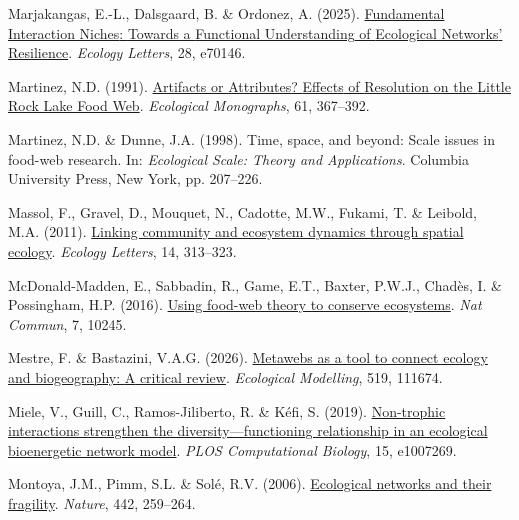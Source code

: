 \documentclass[
]{article}
\newlength{\cslhangindent}
\newenvironment{CSLReferences}[2] %
 {\begin{list}{}{%
  \setlength{\itemindent}{0pt}
  \setlength{\leftmargin}{0pt}
  \setlength{\parsep}{0pt}
  \ifodd #1
   \setlength{\leftmargin}{\cslhangindent}
   \setlength{\itemindent}{-1\cslhangindent}
  \fi
  \setlength{\itemsep}{#2\baselineskip}}}
 {\end{list}}
\begin{document}
\begin{CSLReferences}{1}{0}
Marjakangas, E.-L., Dalsgaard, B. \& Ordonez, A. (2025).
\href{https://doi.org/10.1111/ele.70146}{Fundamental {Interaction
Niches}: {Towards} a {Functional Understanding} of {Ecological
Networks}' {Resilience}}. \emph{Ecology Letters}, 28, e70146.

Martinez, N.D. (1991). \href{https://doi.org/10.2307/2937047}{Artifacts
or {Attributes}? {Effects} of {Resolution} on the {Little Rock Lake Food
Web}}. \emph{Ecological Monographs}, 61, 367--392.

Martinez, N.D. \& Dunne, J.A. (1998). Time, space, and beyond: Scale
issues in food-web research. In: \emph{Ecological {Scale}: {Theory} and
{Applications}}. Columbia University Press, New York, pp. 207--226.

Massol, F., Gravel, D., Mouquet, N., Cadotte, M.W., Fukami, T. \&
Leibold, M.A. (2011).
\href{https://doi.org/10.1111/j.1461-0248.2011.01588.x}{Linking
community and ecosystem dynamics through spatial ecology}. \emph{Ecology
Letters}, 14, 313--323.

McDonald-Madden, E., Sabbadin, R., Game, E.T., Baxter, P.W.J., Chadès,
I. \& Possingham, H.P. (2016).
\href{https://doi.org/10.1038/ncomms10245}{Using food-web theory to
conserve ecosystems}. \emph{Nat Commun}, 7, 10245.

Mestre, F. \& Bastazini, V.A.G. (2026).
\href{https://doi.org/10.1016/j.ecolmodel.2026.111674}{Metawebs as a
tool to connect ecology and biogeography: {A} critical review}.
\emph{Ecological Modelling}, 519, 111674.

Miele, V., Guill, C., Ramos-Jiliberto, R. \& Kéfi, S. (2019).
\href{https://doi.org/10.1371/journal.pcbi.1007269}{Non-trophic
interactions strengthen the diversity---functioning relationship in an
ecological bioenergetic network model}. \emph{PLOS Computational
Biology}, 15, e1007269.

Montoya, J.M., Pimm, S.L. \& Solé, R.V. (2006).
\href{https://doi.org/10.1038/nature04927}{Ecological networks and their
fragility}. \emph{Nature}, 442, 259--264.


\end{CSLReferences}
\end{document}
